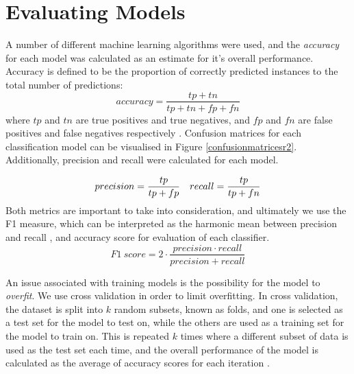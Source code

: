 \section{Evaluating Models} \label{evalmodels}

A number of different machine learning algorithms were used, and the \textit{accuracy} for each model was calculated as an estimate for it's overall performance. Accuracy is defined to be the proportion of correctly predicted instances to the total number of predictions:
$$
accuracy = \frac{tp+tn}{tp+tn+fp+fn}
$$
where $tp$ and $tn$ are true positives and true negatives, and $fp$ and $fn$ are false positives and false negatives respectively \cite{vanwinckelen2012estimating}. Confusion matrices for each classification model can be visualised in Figure \ref{confusionmatricesr2}.
Additionally, precision and recall were calculated for each model.

$$
precision = \frac{tp}{tp+fp} \\
\quad recall = \frac{tp}{tp+fn}
$$
Both metrics are important to take into consideration, and ultimately we use the F1 measure, which can be interpreted as the harmonic mean between precision and recall \cite{buckland1994relationship}, and accuracy score for evaluation of each classifier.
$$
F1 \ score = 2 \cdot \frac{precision \cdot recall}{precision + recall}
$$

An issue associated with training models is the possibility for the model to \textit{overfit}. We use cross validation in order to limit overfitting.
In cross validation, the dataset is split into $k$ random subsets, known as folds, and one is selected as a test set for the model to test on, while the others are used as a training set for the model to train on. This is repeated $k$ times where a different subset of data is used as the test set each time, and the overall performance of the model is calculated as the average of accuracy scores for each iteration \cite{berrar2019cross}.

